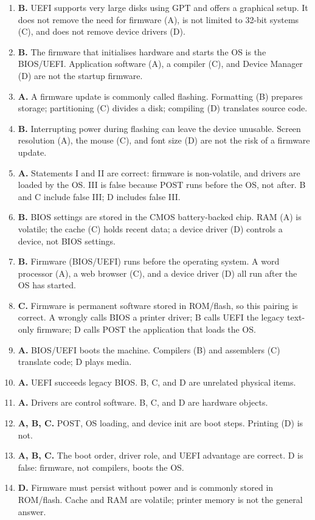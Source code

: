 \begin{enumerate}[label=\textbf{Q\arabic*.}, leftmargin=*]
  wrongly calls them identical; D wrongly calls UEFI a device driver.
\item \textbf{B.} UEFI supports very large disks using GPT and offers a
  graphical setup. It does not remove the need for firmware (A), is not
  limited to 32-bit systems (C), and does not remove device drivers (D).
\item \textbf{B.} The firmware that initialises hardware and starts the OS
  is the BIOS/UEFI. Application software (A), a compiler (C), and Device
  Manager (D) are not the startup firmware.
\item \textbf{A.} A firmware update is commonly called flashing. Formatting
  (B) prepares storage; partitioning (C) divides a disk; compiling (D)
  translates source code.
\item \textbf{B.} Interrupting power during flashing can leave the device
  unusable. Screen resolution (A), the mouse (C), and font size (D) are not
  the risk of a firmware update.
\item \textbf{A.} Statements I and II are correct: firmware is non-volatile,
  and drivers are loaded by the OS. III is false because POST runs before
  the OS, not after. B and C include false III; D includes false III.
\item \textbf{B.} BIOS settings are stored in the CMOS battery-backed chip.
  RAM (A) is volatile; the cache (C) holds recent data; a device driver (D)
  controls a device, not BIOS settings.
\item \textbf{B.} Firmware (BIOS/UEFI) runs before the operating system. A
  word processor (A), a web browser (C), and a device driver (D) all run
  after the OS has started.
\item \textbf{C.} Firmware is permanent software stored in ROM/flash, so this
  pairing is correct. A wrongly calls BIOS a printer driver; B calls UEFI
  the legacy text-only firmware; D calls POST the application that loads the
  OS.

\item \textbf{A.} BIOS/UEFI boots the machine. Compilers (B) and assemblers (C) translate code; D plays media.
\item \textbf{A.} UEFI succeeds legacy BIOS. B, C, and D are unrelated physical items.
\item \textbf{A.} Drivers are control software. B, C, and D are hardware objects.
\item \textbf{A, B, C.} POST, OS loading, and device init are boot steps. Printing (D) is not.
\item \textbf{A, B, C.} The boot order, driver role, and UEFI advantage are correct. D is false: firmware, not compilers, boots the OS.
\item \textbf{D.} Firmware must persist without power and is commonly stored in ROM/flash. Cache and RAM are volatile; printer memory is not the general answer.


\end{enumerate}
